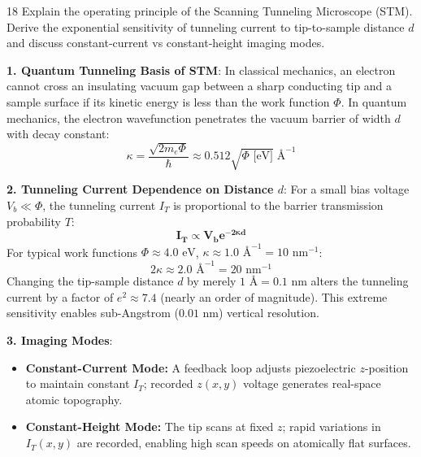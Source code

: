 \begin{theoryq}{18}
Explain the operating principle of the Scanning Tunneling Microscope (STM). Derive the exponential sensitivity of tunneling current to tip-to-sample distance $d$ and discuss constant-current vs constant-height imaging modes.
\end{theoryq}
\begin{theorysol}
\textbf{1. Quantum Tunneling Basis of STM}:
In classical mechanics, an electron cannot cross an insulating vacuum gap between a sharp conducting tip and a sample surface if its kinetic energy is less than the work function $\Phi$.
In quantum mechanics, the electron wavefunction penetrates the vacuum barrier of width $d$ with decay constant:
\begin{equation}
\kappa = \frac{\sqrt{2m_e \Phi}}{\hbar} \approx 0.512\sqrt{\Phi\text{ [eV]}}\; \text{\AA}^{-1}
\end{equation}

\textbf{2. Tunneling Current Dependence on Distance $d$}:
For a small bias voltage $V_b \ll \Phi$, the tunneling current $I_T$ is proportional to the barrier transmission probability $T$:
\begin{equation}
\mathbf{I_T \propto V_b e^{-2\kappa d}}
\end{equation}
For typical work functions $\Phi \approx 4.0\text{ eV}$, $\kappa \approx 1.0\text{ \AA}^{-1} = 10\text{ nm}^{-1}$:
\begin{equation}
2\kappa \approx 2.0\text{ \AA}^{-1} = 20\text{ nm}^{-1}
\end{equation}
Changing the tip-sample distance $d$ by merely $1\text{ \AA} = 0.1\text{ nm}$ alters the tunneling current by a factor of $e^{2} \approx 7.4$ (nearly an order of magnitude). This extreme sensitivity enables sub-Angstrom ($0.01\text{ nm}$) vertical resolution.

\textbf{3. Imaging Modes}:
\begin{itemize}
\item \textbf{Constant-Current Mode:} A feedback loop adjusts piezoelectric $z$-position to maintain constant $I_T$; recorded $z(x,y)$ voltage generates real-space atomic topography.
\item \textbf{Constant-Height Mode:} The tip scans at fixed $z$; rapid variations in $I_T(x,y)$ are recorded, enabling high scan speeds on atomically flat surfaces.
\end{itemize}

\end{theorysol}
\vspace{4mm}

